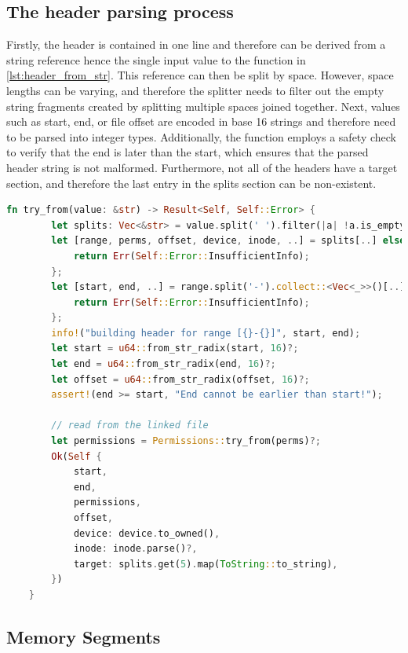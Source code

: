 \subsection{The header parsing process}

Firstly, the header is contained in one line and therefore can be derived from a string reference hence the single input value to the function in \autoref{lst:header_from_str}. This reference can then be split by space. However, space lengths can be varying, and therefore the splitter needs to filter out the empty string fragments created by splitting multiple spaces joined together.
Next, values such as start, end, or file offset are encoded in base 16 strings and therefore need to be parsed into integer types.
Additionally, the function employs a safety check to verify that the end is later than the start, which ensures that the parsed header string is not malformed.
Furthermore, not all of the headers have a target section, and therefore the last entry in the splits section can be non-existent.

\begin{lstlisting}[caption=\label{lst:header_from_str}{Function parsing lines into Header objects}, language=Rust]
    fn try_from(value: &str) -> Result<Self, Self::Error> {
        let splits: Vec<&str> = value.split(' ').filter(|a| !a.is_empty()).collect();
        let [range, perms, offset, device, inode, ..] = splits[..] else {
            return Err(Self::Error::InsufficientInfo);
        };
        let [start, end, ..] = range.split('-').collect::<Vec<_>>()[..] else {
            return Err(Self::Error::InsufficientInfo);
        };
        info!("building header for range [{}-{}]", start, end);
        let start = u64::from_str_radix(start, 16)?;
        let end = u64::from_str_radix(end, 16)?;
        let offset = u64::from_str_radix(offset, 16)?;
        assert!(end >= start, "End cannot be earlier than start!");

        // read from the linked file
        let permissions = Permissions::try_from(perms)?;
        Ok(Self {
            start,
            end,
            permissions,
            offset,
            device: device.to_owned(),
            inode: inode.parse()?,
            target: splits.get(5).map(ToString::to_string),
        })
    }
\end{lstlisting}

\subsection{Memory Segments}
\label{reader:segment}

